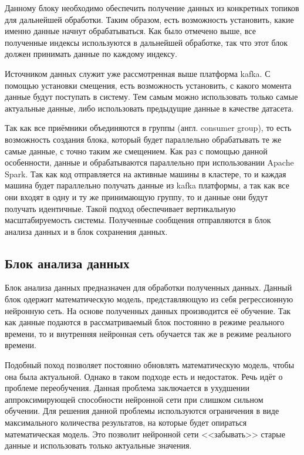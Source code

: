 Данному блоку необходимо обеспечить получение данных из конкретных топиков для дальнейшей обработки.
Таким образом, есть возможность установить, какие именно данные начнут обрабатываться.
Как было отмечено выше, все полученные индексы используются в дальнейшей обработке, так что этот блок должен принимать данные по каждому индексу.

Источником данных служит уже рассмотренная выше платформа kafka.
С помощью установки смещения, есть возможность установить, с какого момента данные будут поступать в систему.
Тем самым можно использовать только самые актуальные данные, либо использовать предыдущие данные в качестве датасета.

Так как все приёмники объединяются в группы (англ. consumer group), то есть возможность создания блока, который будет параллельно обрабатывать те же самые данные, с точно таким же смещением.
Как раз с помощью данной особенности, данные и обрабатываются параллельно при использовании Apache Spark.
Так как код отправляется на активные машины в кластере, то и каждая машина будет параллельно получать данные из kafka платформы, а так как все они входят в одну и ту же принимающую группу, то и данные они будут получать идентичные.
Такой подход обеспечивает вертикальную масштабируемость системы.
Полученные сообщения отправляются в блок анализа данных и в блок сохранения данных.

\subsection{Блок анализа данных}

Блок анализа данных предназначен для обработки полученных данных.
Данный блок одержит математическую модель, представляющую из себя регрессионную нейронную сеть.
На основе полученных данных производится её обучение.
Так как данные подаются в рассматриваемый блок постоянно в режиме реального времени, то и внутренняя нейронная сеть обучается так же в режиме реального времени.

Подобный поход позволяет постоянно обновлять математическую модель, чтобы она была актуальной.
Однако в таком подходе есть и недостаток.
Речь идёт о проблеме переобучения.
Данная проблема заключается в ухудшении аппроксимирующей способности нейронной сети при слишком сильном обучении.
Для решения данной проблемы используются ограничения в виде максимального количества результатов, на которые будет опираться математическая модель.
Это позволит нейронной сети <<забывать>> старые данные и использовать только актуальные значения.

